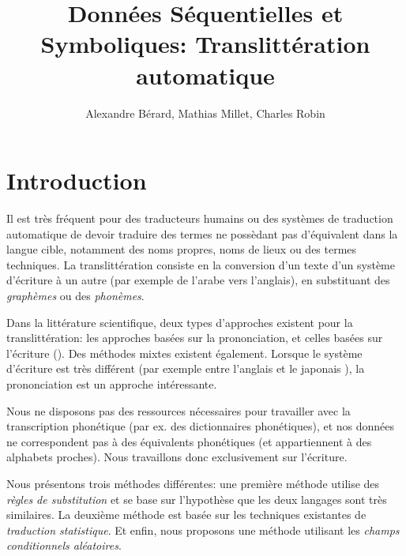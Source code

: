 \documentclass{article}
\begin{document}
\title{Données Séquentielles et Symboliques: Translittération automatique}

\author{Alexandre Bérard, Mathias Millet, Charles Robin}
\maketitle
\begin{abstract}
\end{abstract}
\vspace{0.5em}
\section{Introduction}

Il est très fréquent pour des traducteurs humains ou des systèmes de traduction automatique de devoir traduire des termes ne possèdant pas d'équivalent dans la langue cible, notamment des noms propres, noms de lieux ou des termes techniques.
La translittération consiste en la conversion d'un texte d'un système d'écriture à un autre (par exemple de l'arabe vers l'anglais), en substituant des \emph{graphèmes} ou des \emph{phonèmes}.

Dans la littérature scientifique, deux types d'approches existent pour la translittération: les approches basées sur la prononciation, et celles basées sur l'écriture (\cite{OhChoi06}). Des méthodes mixtes existent également. Lorsque le système d'écriture est très différent (par exemple entre l'anglais et le japonais \cite{Knight98}), la prononciation est un approche intéressante.

Nous ne disposons pas des ressources nécessaires pour travailler avec la transcription phonétique (par ex. des dictionnaires phonétiques), et nos données ne correspondent pas à des équivalents phonétiques (et appartiennent à des alphabets proches). Nous travaillons donc exclusivement sur l'écriture.

Nous présentons trois méthodes différentes: une première méthode utilise des \emph{règles de substitution} et se base sur l'hypothèse que les deux langages sont très similaires. La deuxième méthode est basée sur les techniques existantes de \emph{traduction statistique}. Et enfin, nous proposons une méthode utilisant les \emph{champs conditionnels aléatoires}.
\end{document}

